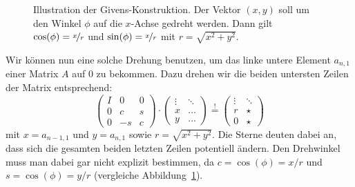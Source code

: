 \begin{figure}
  \centering

  \caption{Illustration der Givens-Konstruktion. Der Vektor $(x,y)$
    soll um den Winkel $\phi$ auf die $x$-Achse gedreht werden. Dann
    gilt $\cos(\phi) = \nicefrac{x}{r}$  und $\sin(\phi) =
    \nicefrac{x}{r}$ mit $r=\sqrt{x^2+y^2}$.}
  \label{fig:givens}
\end{figure}

Wir können nun eine solche Drehung benutzen, um das linke untere
Element $a_{n,1}$ einer Matrix $A$ auf $0$ zu bekommen. Dazu drehen
wir die beiden untersten Zeilen der Matrix entsprechend:
\begin{equation}
  \begin{pmatrix}
    I & 0 & 0\\
    0 & c  & s\\
    0 & -s  & c
  \end{pmatrix}
  \cdot
  \begin{pmatrix}
    \vdots & \ddots\\
    x & \ldots\\
    y & \ldots
  \end{pmatrix}
  \stackrel{!}{=}
  \begin{pmatrix}
    \vdots & \ddots\\
    r & \star\\
    0 & \star
  \end{pmatrix}
\end{equation}
mit $x=a_{n-1,1}$ und $y=a_{n,1}$ sowie $r=\sqrt{x^2 + y^2}$.  Die
Sterne deuten dabei an, dass sich die gesamten beiden letzten Zeilen
potentiell ändern. Den Drehwinkel muss man dabei gar nicht explizit
bestimmen, da $c=\cos(\phi) = x/r$ und $s=\cos(\phi) = y/r$
(vergleiche Abbildung~\ref{fig:givens}).

